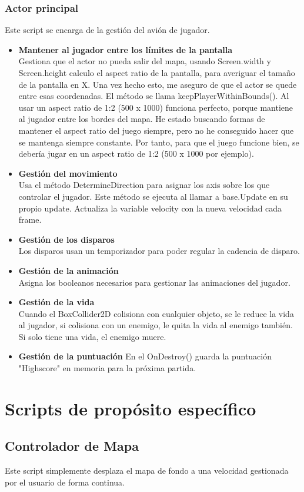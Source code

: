 \documentclass[titlepage, 4apaper]{article}
\begin{document}
\subsubsection{Actor principal}
Este script se encarga de la gestión del avión de jugador. 
\begin{itemize}
	\item \textbf{Mantener al jugador entre los límites de la pantalla}\\Gestiona que el actor no pueda salir del mapa, usando Screen.width y Screen.height calculo el aspect ratio de la pantalla, para averiguar el tamaño de la pantalla en X. Una vez hecho esto, me aseguro de que el actor se quede entre esas coordenadas. El método se llama keepPlayerWithinBounds(). Al usar un aspect ratio de 1:2 (500 x 1000) funciona perfecto, porque mantiene al jugador entre los bordes del mapa. He estado buscando formas de mantener el aspect ratio del juego siempre, pero no he conseguido hacer que se mantenga siempre constante. Por tanto, para que el juego funcione bien, se debería jugar en un aspect ratio de 1:2 (500 x 1000 por ejemplo).
	\item \textbf{Gestión del movimiento}\\Usa el método DetermineDirection para asignar los axis sobre los que controlar el jugador. Este método se ejecuta al llamar a base.Update en su propio update. Actualiza la variable velocity con la nueva velocidad cada frame.
	\item \textbf{Gestión de los disparos}\\Los disparos usan un temporizador para poder regular la cadencia de disparo.
	\item \textbf{Gestión de la animación}\\Asigna los booleanos necesarios para gestionar las animaciones del jugador.
	\item \textbf{Gestión de la vida}\\Cuando el BoxCollider2D colisiona con cualquier objeto, se le reduce la vida al jugador, si colisiona con un enemigo, le quita la vida al enemigo también. Si solo tiene una vida, el enemigo muere.
	\item \textbf{Gestión de la puntuación} En el OnDestroy() guarda la puntuación "Highscore" en memoria para la próxima partida.
\end{itemize}
\section{Scripts de propósito específico}
\subsection{Controlador de Mapa}
Este script simplemente desplaza el mapa de fondo a una velocidad gestionada por el usuario de forma continua.
\end{document}
